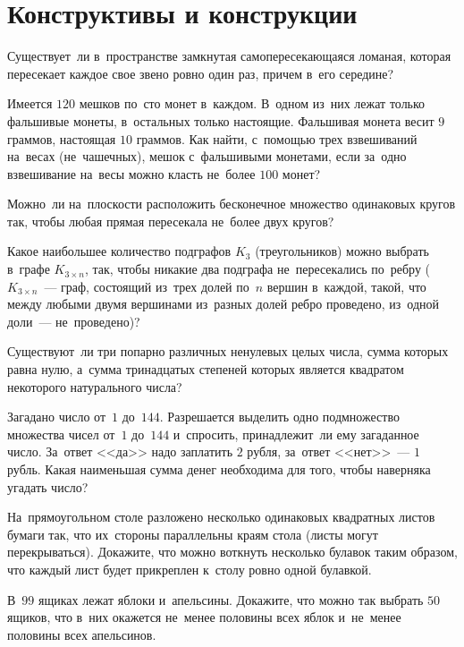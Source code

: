 
\section*{Конструктивы и конструкции}

\begin{problems}

\item
Существует~ли в~пространстве замкнутая самопересекающаяся ломаная, которая
пересекает каждое свое звено ровно один раз, причем в~его середине?

\item
Имеется $120$ мешков по~сто монет в~каждом.
В~одном из~них лежат только фальшивые монеты, в~остальных только настоящие.
Фальшивая монета весит $9$ граммов, настоящая $10$ граммов.
Как найти, с~помощью трех взвешиваний на~весах (не~чашечных), мешок
с~фальшивыми монетами, если за~одно взвешивание на~весы можно класть не~более
$100$ монет?

\item
Можно~ли на~плоскости расположить бесконечное множество одинаковых кругов так,
чтобы любая прямая пересекала не~более двух кругов?

\item
Какое наибольшее количество подграфов $K_3$ (треугольников) можно выбрать
в~графе $K_{3\times n}$, так, чтобы никакие два подграфа не~пересекались
по~ребру ($K_{3\times n}$~--- граф, состоящий из~трех долей по~$n$ вершин
в~каждой, такой, что между любыми двумя вершинами из~разных долей ребро
проведено, из~одной доли~--- не~проведено)?

\item
Существуют~ли три попарно различных ненулевых целых числа, сумма которых равна
нулю, а~сумма тринадцатых степеней которых является квадратом некоторого
натурального числа?

\item
Загадано число от~$1$ до~$144$.
Разрешается выделить одно подмножество множества чисел от~$1$ до~$144$
и~спросить, принадлежит~ли ему загаданное число.
За~ответ <<да>> надо заплатить $2$ рубля, за~ответ <<нет>>~--- $1$ рубль.
Какая наименьшая сумма денег необходима для того, чтобы наверняка угадать
число?

\item
На~прямоугольном столе разложено несколько одинаковых квадратных листов бумаги
так, что их~стороны параллельны краям стола (листы могут перекрываться).
Докажите, что можно воткнуть несколько булавок таким образом, что каждый лист
будет прикреплен к~столу ровно одной булавкой.


\item
В~$99$ ящиках лежат яблоки и~апельсины.
Докажите, что можно так выбрать $50$ ящиков, что в~них окажется не~менее
половины всех яблок и~не~менее половины всех апельсинов.

\end{problems}

